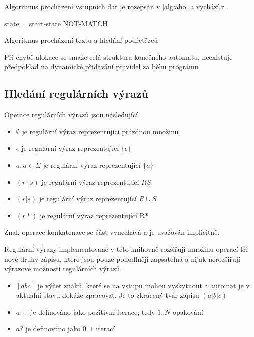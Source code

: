 Algoritmus procházení vstupních dat je rozepsán v \ref{alg:aho} a vychází z \cite{aho}.

\begin{algorithm}
	state = start-state\;
	{
	}
	\Return NOT-MATCH\;
	\caption{Algoritmus procházení textu a hledání podřetězců}
\end{algorithm}\label{alg:aho}

Při chybě alokace se smaže celá struktura konečného automatu, neexistuje předpoklad na dynamické přidávání pravidel za běhu programu

\subsection{Hledání regulárních výrazů} %

Operace regulárních výrazů jsou následující

\begin{itemize}
	\item{$\emptyset$ je regulární výraz reprezentující prázdnou množinu}
	\item{$\epsilon$ je regulární výraz reprezentující $\{\epsilon\}$}
	\item{$a, a \in \Sigma$ je regulární výraz reprezentující $\{a\}$}
	\item{$(r \cdot s)$ je regulární výraz reprezentující $RS$}
	\item{$(r | s)$ je regulární výraz reprezentující $R \cup S$}
	\item{$(r*)$ je regulární výraz reprezentující R*}
\end{itemize}

Znak operace konkatenace %
se část vynechává a je uvažován implicitně.

Regulární výrazy implementované v této knihovně rozšiřují množinu operací tři nové druhy zápisu,
které jsou pouze pohodlněji zapsatelná a nijak nerozšiřují výrazové možnosti regulárních výrazů.

\begin{itemize}
	\item{$[abc]$ je výčet znaků, které se na vstupu mohou vyskytnout a automat je v aktuální stavu dokáže zpracovat. Je to zkrácený tvar zápisu $(a|b|c)$}
	\item{$a+$ je definováno jako pozitivní iterace, tedy $1..N$ opakování}
	\item{$a?$ je definováno jako $0..1$ iterací}
\end{itemize}

